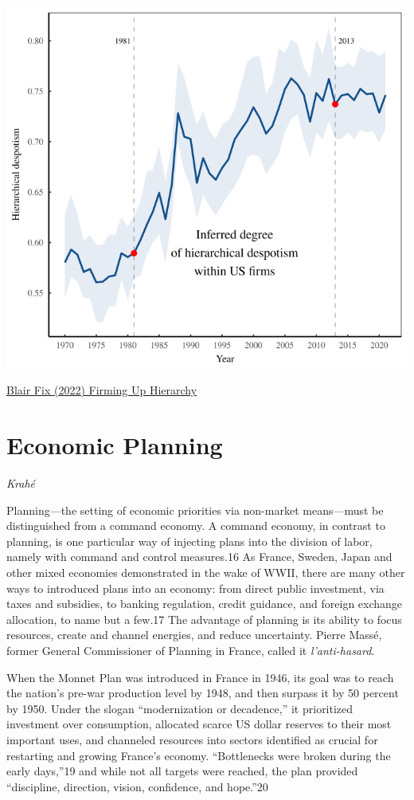 \documentclass[
]{book}
\begin{document}
\includegraphics{fig/hierarchy_despotism.png}

\href{https://economicsfromthetopdown.com/2022/11/19/firming-up-hierarchy/}{Blair Fix (2022) Firming Up Hierarchy}

\hypertarget{economic-planning}{%
\chapter{Economic Planning}\label{economic-planning}}

\emph{Krahé}

Planning---the setting of economic priorities via non-market means---must be distinguished from a command economy. A command economy, in contrast to planning, is one particular way of injecting plans into the division of labor, namely with command and control measures.16 As France, Sweden, Japan and other mixed economies demonstrated in the wake of WWII, there are many other ways to introduced plans into an economy: from direct public investment, via taxes and subsidies, to banking regulation, credit guidance, and foreign exchange allocation, to name but a few.17 The advantage of planning is its ability to focus resources, create and channel energies, and reduce uncertainty. Pierre Massé, former General Commissioner of Planning in France, called it \emph{l'anti-hasard}.

When the Monnet Plan was introduced in France in 1946, its goal was to reach the nation's pre-war production level by 1948, and then surpass it by 50 percent by 1950. Under the slogan ``modernization or decadence,'' it prioritized investment over consumption, allocated scarce US dollar reserves to their most important uses, and channeled resources into sectors identified as crucial for restarting and growing France's economy. ``Bottlenecks were broken during the early days,''19 and while not all targets were reached, the plan provided ``discipline, direction, vision, confidence, and hope.''20
\end{document}
